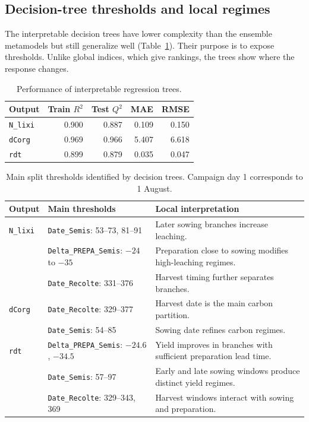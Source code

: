 \documentclass[11pt,a4paper]{article}
\newcommand{\param}[1]{\texttt{#1}}
\begin{document}
\FloatBarrier

\subsection{Decision-tree thresholds and local regimes}

The interpretable decision trees have lower complexity than the ensemble metamodels but still generalize well (Table~\ref{tab:tree}). Their purpose is to expose thresholds. Unlike global indices, which give rankings, the trees show where the response changes.

\begin{table}[!tbp]
\centering
\caption{Performance of interpretable regression trees.}
\label{tab:tree}
\begin{tabular}{lrrrr}
\toprule
Output & Train $R^2$ & Test $Q^2$ & MAE & RMSE \\
\midrule
\param{N\_lixi} & 0.900 & 0.887 & 0.109 & 0.150 \\
\param{dCorg} & 0.969 & 0.966 & 5.407 & 6.618 \\
\param{rdt} & 0.899 & 0.879 & 0.035 & 0.047 \\
\bottomrule
\end{tabular}
\end{table}

\begin{table}[!tbp]
\centering
\caption{Main split thresholds identified by decision trees. Campaign day 1 corresponds to 1 August.}
\label{tab:thresholds}
\small
\begin{tabularx}{\textwidth}{l>{\raggedright\arraybackslash}p{5.1cm}Y}
\toprule
Output & Main thresholds & Local interpretation \\
\midrule
\param{N\_lixi} & \param{Date\_Semis}: 53--73, 81--91 & Later sowing branches increase leaching. \\
 & \param{Delta\_PREPA\_Semis}: $-24$ to $-35$ & Preparation close to sowing modifies high-leaching regimes. \\
 & \param{Date\_Recolte}: 331--376 & Harvest timing further separates branches. \\
\addlinespace
\param{dCorg} & \param{Date\_Recolte}: 329--377 & Harvest date is the main carbon partition. \\
 & \param{Date\_Semis}: 54--85 & Sowing date refines carbon regimes. \\
\addlinespace
\param{rdt} & \param{Delta\_PREPA\_Semis}: $-24.6$, $-34.5$ & Yield improves in branches with sufficient preparation lead time. \\
 & \param{Date\_Semis}: 57--97 & Early and late sowing windows produce distinct yield regimes. \\
 & \param{Date\_Recolte}: 329--343, 369 & Harvest windows interact with sowing and preparation. \\
\bottomrule
\end{tabularx}
\end{table}
\end{document}
